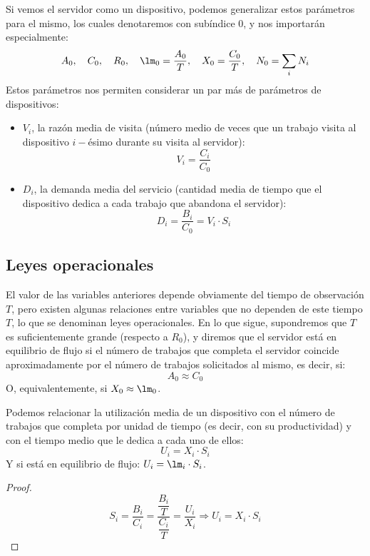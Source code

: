 Si vemos el servidor como un dispositivo, podemos generalizar estos parámetros para el mismo, los cuales denotaremos con subíndice $0$, y nos importarán especialmente:
\begin{equation*}
    A_0,\quad C_0,\quad R_0,\quad \lm_0 = \dfrac{A_0}{T},\quad X_0 = \dfrac{C_0}{T},\quad N_0 = \sum_{i} N_i
\end{equation*}
Estos parámetros nos permiten considerar un par más de parámetros de dispositivos:
\begin{itemize}
    \item $V_i$, la razón media de visita (número medio de veces que un trabajo visita al dispositivo $i-$ésimo durante su visita al servidor):
        \begin{equation*}
            V_i = \dfrac{C_i}{C_0}
        \end{equation*}
    \item $D_i$, la demanda media del servicio (cantidad media de tiempo que el dispositivo dedica a cada trabajo que abandona el servidor):
        \begin{equation*}
            D_i = \dfrac{B_i}{C_0} = V_i\cdot S_i
        \end{equation*}
\end{itemize}

\subsection{Leyes operacionales}
El valor de las variables anteriores depende obviamente del tiempo de observación $T$, pero existen algunas relaciones entre variables que no dependen de este tiempo $T$, lo que se denominan leyes operacionales. En lo que sigue, supondremos que $T$ es suficientemente grande (respecto a $R_0$), y diremos que el servidor está en equilibrio de flujo si el número de trabajos que completa el servidor coincide aproximadamente por el número de trabajos solicitados al mismo, es decir, si:
\begin{equation*}
    A_0 \approx C_0
\end{equation*}
O, equivalentemente, si $X_0\approx \lm_0$.

\begin{prop}
    Podemos relacionar la utilización media de un dispositivo con el número de trabajos que completa por unidad de tiempo (es decir, con su productividad) y con el tiempo medio que le dedica a cada uno de ellos:
    \begin{equation*}
        U_i = X_i \cdot S_i
    \end{equation*}
    Y si está en equilibrio de flujo: $U_i = \lm_i \cdot S_i$.
    \begin{proof}
        \begin{equation*}
            S_i = \dfrac{B_i}{C_i} = \dfrac{\dfrac{B_i}{T}}{\dfrac{C_i}{T}} = \dfrac{U_i}{X_i} \Longrightarrow U_i = X_i\cdot S_i
        \end{equation*}
    \end{proof}
\end{prop}

